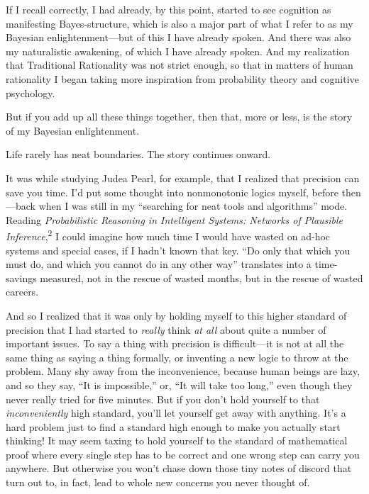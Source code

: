{
 If I recall correctly, I had already, by this point, started to
see cognition as manifesting Bayes-structure, which is also a major
part of what I refer to as my Bayesian enlightenment---but of this I
have already spoken. And there was also my naturalistic awakening, of
which I have already spoken. And my realization that Traditional
Rationality was not strict enough, so that in matters of human
rationality I began taking more inspiration from probability theory and
cognitive psychology.}

{
 But if you add up all these things together, then that, more or
less, is the story of my Bayesian enlightenment.}

{
 Life rarely has neat boundaries. The story continues onward.}

{
 It was while studying Judea Pearl, for example, that I realized
that precision can save you time. I'd put some thought
into nonmonotonic logics myself, before then---back when I was still in
my ``searching for neat tools and
algorithms'' mode. Reading \textit{Probabilistic
Reasoning in Intelligent Systems: Networks of Plausible
Inference},\textsuperscript{2} I could imagine how much time I would
have wasted on ad-hoc systems and special cases, if I
hadn't known that key. ``Do only that
which you must do, and which you cannot do in any other
way'' translates into a time-savings measured, not in
the rescue of wasted months, but in the rescue of wasted careers.}

{
 And so I realized that it was only by holding myself to this
higher standard of precision that I had started to \textit{really}
think \textit{at all} about quite a number of important issues. To say
a thing with precision is difficult---it is not at all the same thing
as saying a thing formally, or inventing a new logic to throw at the
problem. Many shy away from the inconvenience, because human beings are
lazy, and so they say, ``It is
impossible,'' or, ``It will take too
long,'' even though they never really tried for five
minutes. But if you don't hold yourself to that
\textit{inconveniently} high standard, you'll let
yourself get away with anything. It's a hard problem
just to find a standard high enough to make you actually start
thinking! It may seem taxing to hold yourself to the standard of
mathematical proof where every single step has to be correct and one
wrong step can carry you anywhere. But otherwise you
won't chase down those tiny notes of discord that turn
out to, in fact, lead to whole new concerns you never thought of.}

